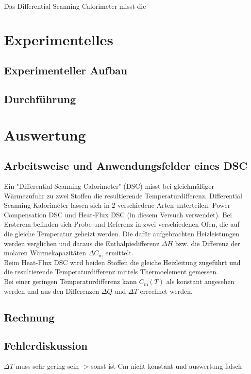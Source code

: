 \documentclass[a4paper,12pt,oneside,onecolum,final,openany]{report}
\begin{document}
Das Differential Scanning Calorimeter misst die 





\tableofcontents
\chapter{Experimentelles}
\section{Experimenteller Aufbau}

\section{Durchführung}

\chapter{Auswertung}
\section{Arbeitsweise und Anwendungsfelder eines DSC}
Ein "Differential Scanning Calorimeter" (DSC) misst bei gleichmäßiger Wärmezufuhr zu zwei Stoffen die resultierende Temperaturdifferenz.
Differential Scanning Kalorimeter lassen sich in 2 verschiedene Arten unterteilen: Power Compensation DSC und Heat-Flux DSC (in diesem Versuch verwendet). Bei Ersterem befinden sich Probe und Referenz in zwei verschiedenen Öfen, die auf die gleiche Temperatur geheizt werden. Die dafür aufgebrachten Heizleistungen werden verglichen und daraus die Enthalpiedifferenz $\Delta H$ bzw. die Differenz der molaren Wärmekapazitäten $\Delta C_\mathrm{m}$ ermittelt.\\
Beim Heat-Flux DSC wird beiden Stoffen die gleiche Heizleitung zugeführt und die resultierende Temperaturdifferenz mittels Thermoelement gemessen.\\
Bei einer geringen Temperaturdifferenz kann $C_\mathrm{m}(T)$ als konstant angesehen werden und aus den Differenzen $\Delta Q$ und $\Delta T$ errechnet werden.



\section{Rechnung}
\section{Fehlerdiskussion}
$\Delta T$ muss sehr gering sein -> sonst ist Cm nicht konstant und auswertung falsch
\end{document}
